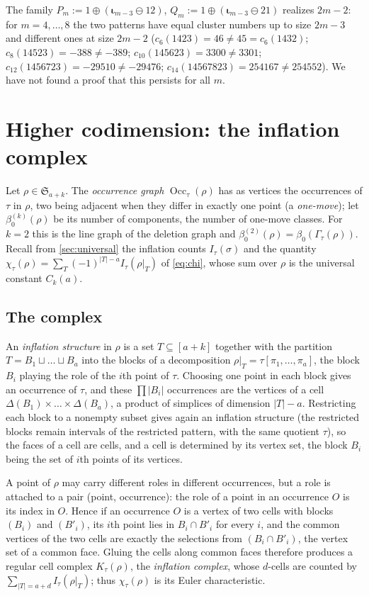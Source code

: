 \documentclass[11pt,reqno]{amsart}
\theoremstyle{plain}
\theoremstyle{definition}
\theoremstyle{remark}
\newcommand{\Occ}{\operatorname{Occ}}
\let\greekiota\iota
\renewcommand{\iota}{\boldsymbol{\greekiota}}
\newcommand{\Sym}{\mathfrak{S}}
\newcommand{\Gam}{\Gamma}
\newcommand{\bz}{\beta_0}
\begin{document}
The family $P_m:=1\oplus(\iota_{m-3}\ominus12)$, $Q_m:=1\oplus(\iota_{m-3}\ominus21)$ realizes $2m-2$: for $m=4,\dots,8$ the two patterns have equal cluster numbers up to size $2m-3$ and different ones at size $2m-2$ ($c_6(1423)=46\ne45=c_6(1432)$; $c_8(14523)=-388\ne-389$; $c_{10}(145623)=3300\ne3301$; $c_{12}(1456723)=-29510\ne-29476$; $c_{14}(14567823)=254167\ne254552$). We have not found a proof that this persists for all $m$.

\section{Higher codimension: the inflation complex}\label{sec:higher}

Let $\rho\in\Sym_{a+k}$. The \emph{occurrence graph} $\Occ_\tau(\rho)$ has as vertices the occurrences of $\tau$ in $\rho$, two being adjacent when they differ in exactly one point (a \emph{one-move}); let $\bz^{(k)}(\rho)$ be its number of components, the number of one-move classes. For $k=2$ this is the line graph of the deletion graph and $\bz^{(2)}(\rho)=\bz(\Gam_\tau(\rho))$. Recall from \cref{sec:universal} the inflation counts $I_\tau(\sigma)$ and the quantity $\chi_\tau(\rho)=\sum_T(-1)^{|T|-a}I_\tau(\rho|_T)$ of \eqref{eq:chi}, whose sum over $\rho$ is the universal constant $C_k(a)$.

\subsection{The complex}
An \emph{inflation structure} in $\rho$ is a set $T\subseteq[a+k]$ together with the partition $T=B_1\sqcup\dots\sqcup B_a$ into the blocks of a decomposition $\rho|_T=\tau[\pi_1,\dots,\pi_a]$, the block $B_i$ playing the role of the $i$th point of $\tau$. Choosing one point in each block gives an occurrence of $\tau$, and these $\prod|B_i|$ occurrences are the vertices of a cell $\Delta(B_1)\times\dots\times\Delta(B_a)$, a product of simplices of dimension $|T|-a$. Restricting each block to a nonempty subset gives again an inflation structure (the restricted blocks remain intervals of the restricted pattern, with the same quotient $\tau$), so the faces of a cell are cells, and a cell is determined by its vertex set, the block $B_i$ being the set of $i$th points of its vertices. 

A point of $\rho$ may carry different roles in different occurrences, but a role is attached to a pair (point, occurrence): the role of a point in an occurrence $O$ is its index in $O$. Hence if an occurrence $O$ is a vertex of two cells with blocks $(B_i)$ and $(B'_i)$, its $i$th point lies in $B_i\cap B'_i$ for every $i$, and the common vertices of the two cells are exactly the selections from $(B_i\cap B'_i)$, the vertex set of a common face. Gluing the cells along common faces therefore produces a regular cell complex $K_\tau(\rho)$, the \emph{inflation complex}, whose $d$-cells are counted by $\sum_{|T|=a+d}I_\tau(\rho|_T)$; thus $\chi_\tau(\rho)$ is its Euler characteristic.
\end{document}
